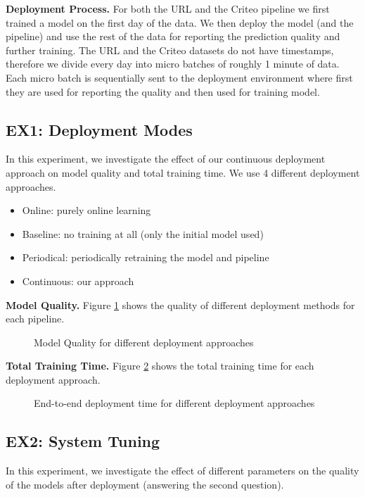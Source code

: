 \textbf{Deployment Process. }
For both the URL and the Criteo pipeline we first trained a model on the first day of the data.
We then deploy the model (and the pipeline) and use the rest of the data for reporting the prediction quality and further training.
The URL and the Criteo datasets do not have timestamps, therefore we divide every day into micro batches of roughly 1 minute of data. 
Each micro batch is sequentially sent to the deployment environment where first they are used for reporting the quality and then used for training model.

\subsection{EX1: Deployment Modes}
In this experiment, we investigate the effect of our continuous deployment approach on model quality and total training time.
We use 4 different deployment approaches.
\begin{itemize}
\item Online: purely online learning
\item Baseline: no training at all (only the initial model used)
\item Periodical: periodically retraining the model and pipeline
\item Continuous: our approach
\end{itemize}

\textbf{Model Quality. }
Figure \ref{deployment-quality-figure} shows the quality of different deployment methods for each pipeline.

\begin{figure}[h!]
\centering
\resizebox{\columnwidth}{!}{}
\caption{Model Quality for different deployment approaches}
\label{deployment-quality-figure}
\end{figure}

\textbf{Total Training Time. }
Figure \ref{deployment-time-figure} shows the total training time for each deployment approach.

\begin{figure}[h!]
\centering
\resizebox{\columnwidth}{!}{}
\caption{End-to-end deployment time for different deployment approaches}
\label{deployment-time-figure}
\end{figure}

\subsection{EX2: System Tuning}
In this experiment, we investigate the effect of different parameters on the quality of the models after deployment (answering the second question).

